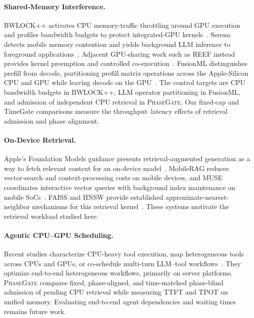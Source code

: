 \documentclass{article}
\newcommand{\system}{\textsc{PhaseGate}\xspace}
\begin{document}
\paragraph{Shared-Memory Interference.}
BWLOCK++ activates CPU memory-traffic throttling around GPU execution and profiles bandwidth budgets to protect integrated-GPU kernels~\cite{ali2018bwlock}.
Sereno detects mobile memory contention and yields background LLM inference to foreground applications~\cite{xin2026sereno}.
Adjacent GPU-sharing work such as REEF instead provides kernel preemption and controlled co-execution~\cite{han2022reef}.
FusionML distinguishes prefill from decode, partitioning prefill matrix operations across the Apple-Silicon CPU and GPU while leaving decode on the GPU~\cite{mohite2026fusionml}.
The control targets are CPU bandwidth budgets in BWLOCK++, LLM operator partitioning in FusionML, and admission of independent CPU retrieval in \system.
Our fixed-cap and TimeGate comparisons measure the throughput--latency effects of retrieval admission and phase alignment.

\paragraph{On-Device Retrieval.}
Apple's Foundation Models guidance presents retrieval-augmented generation as a way to fetch relevant context for an on-device model~\cite{apple2026rag}.
MobileRAG reduces vector-search and context-processing costs on mobile devices, and MUSE coordinates interactive vector queries with background index maintenance on mobile SoCs~\cite{park2025mobilerag,zhao2026muse}.
FAISS and HNSW provide established approximate-nearest-neighbor mechanisms for this retrieval kernel~\cite{johnson2021faiss,malkov2020hnsw}.
These systems motivate the retrieval workload studied here.

\paragraph{Agentic CPU--GPU Scheduling.}
Recent studies characterize CPU-heavy tool execution, map heterogeneous tools across CPUs and GPUs, or co-schedule multi-turn LLM--tool workflows~\cite{raj2025cpu,lu2026agentic,wang2026mars}.
They optimize end-to-end heterogeneous workflows, primarily on server platforms.
\system compares fixed, phase-aligned, and time-matched phase-blind admission of pending CPU retrieval while measuring TTFT and TPOT on unified memory.
Evaluating end-to-end agent dependencies and waiting times remains future work.
\end{document}
